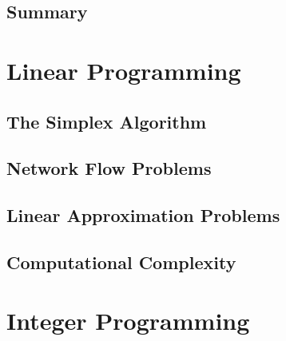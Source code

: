\subsection{Summary}\label{sec:sim-summary}


\section{Linear Programming}\label{sec:lp}
\label{sec:lp-overview}

\subsection{The Simplex Algorithm}\label{sec:simplex}


\subsection{Network Flow Problems}\label{sec:xportation}


\subsection{Linear Approximation Problems}\label{sec:approx}


\subsection{Computational Complexity}\label{sec:complexity}


\section{Integer Programming}\label{sec:ip}

